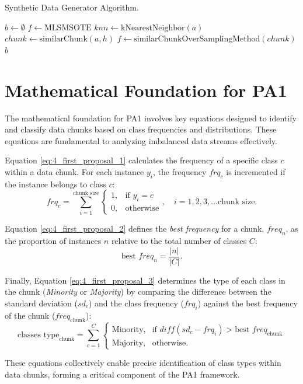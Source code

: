 \begin{algorithm}[H]
	\caption{Synthetic Data Generator Algorithm.}
	\label{alg:4_alg_2}
	$b \gets \emptyset$\;
	$f \gets \text{MLSMSOTE}$\;
	$knn \gets \text{kNearestNeighbor}(a)$\;
	$chunk \gets \text{similarChunk}(a, h)$\;
	$f \gets \text{similarChunkOverSamplingMethod}(chunk)$\;
	\Return $b$\;
	\end{algorithm}

	\section{Mathematical Foundation for PA1}
	\label{sec:math_foundation_pa1}
	
	The mathematical foundation for PA1 involves key equations designed to identify and classify data chunks based on class frequencies and distributions. These equations are fundamental to analyzing imbalanced data streams effectively.
	
	Equation \ref{eq:4_first_proposal_1} calculates the frequency of a specific class \(c\) within a data chunk. For each instance \(y_i\), the frequency \(frq_{c}\) is incremented if the instance belongs to class \(c\):  
	\begin{equation}
	\label{eq:4_first_proposal_1}
	frq_{c} = \sum_{i=1}^{\text{chunk size}} 
	\begin{cases} 
	1, & \text{if } y_i = c \\
	0, & \text{otherwise}
	\end{cases}, \quad i = 1, 2, 3, \dots \text{chunk size}.
	\end{equation}
	
	Equation \ref{eq:4_first_proposal_2} defines the \textit{best frequency} for a chunk, \(freq_n\), as the proportion of instances \(n\) relative to the total number of classes \(C\):  
	\begin{equation}
	\label{eq:4_first_proposal_2}
	\text{best } freq_{n} = \frac{|n|}{|C|}.
	\end{equation}
	
	Finally, Equation \ref{eq:4_first_proposal_3} determines the type of each class in the chunk (\textit{Minority} or \textit{Majority}) by comparing the difference between the standard deviation (\(sd_c\)) and the class frequency (\(frq_i\)) against the best frequency of the chunk (\(freq_{\text{chunk}}\)):  
	\begin{equation}
	\label{eq:4_first_proposal_3}
	\text{classes type}_{\text{chunk}} = \sum_{c=1}^{C} 
	\begin{cases} 
	\text{Minority,} & \text{if } diff(sd_c - frq_i) > \text{best } freq_{\text{chunk}} \\
	\text{Majority,} & \text{otherwise}.
	\end{cases}
	\end{equation}
	
	These equations collectively enable precise identification of class types within data chunks, forming a critical component of the PA1 framework.
	
	